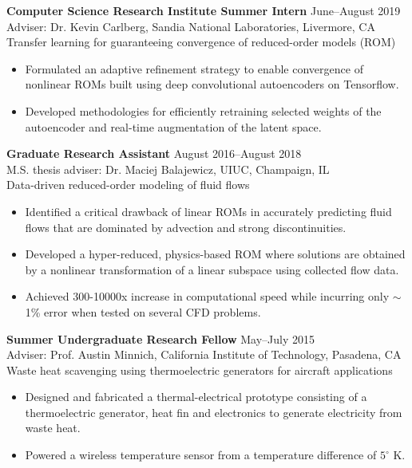 \documentclass[margin]{res}
\begin{document}
\begin{resume}
{\bf Computer Science Research Institute Summer Intern} \hfill June--August 2019\\
Adviser: Dr. Kevin Carlberg, Sandia National Laboratories, Livermore, CA \\
%
Transfer learning for guaranteeing convergence of reduced-order models (ROM)
\begin{itemize}
\item Formulated an adaptive refinement strategy to enable convergence of nonlinear ROMs built using deep convolutional autoencoders on Tensorflow.
\item Developed methodologies for efficiently retraining selected weights of the autoencoder and real-time augmentation of the latent space.
\end{itemize}

{\bf Graduate Research Assistant} \hfill August 2016--August 2018\\
M.S. thesis adviser: Dr. Maciej Balajewicz, UIUC, Champaign, IL \\
Data-driven reduced-order modeling of fluid flows
\begin{itemize}
	\item Identified a critical drawback of linear ROMs in accurately predicting fluid flows that are dominated by advection and strong discontinuities.
	\item Developed a hyper-reduced, physics-based ROM where solutions are obtained by a nonlinear transformation of a linear subspace using collected flow data.
	\item Achieved 300-10000x increase in computational speed while incurring only $\sim$1\% error when tested on several CFD problems. 
\end{itemize}


{\bf Summer Undergraduate Research Fellow} \hfill May--July 2015\\
Adviser: Prof. Austin Minnich, California Institute of Technology, Pasadena, CA \\
Waste heat scavenging using thermoelectric generators for aircraft applications
\begin{itemize}
	\item Designed and fabricated a thermal-electrical prototype consisting of a thermoelectric generator, heat fin and electronics to generate electricity from waste heat. 
	\item Powered a wireless temperature sensor from a temperature difference of $5^\circ$ K.
\end{itemize}


\end{resume}
\end{document}
